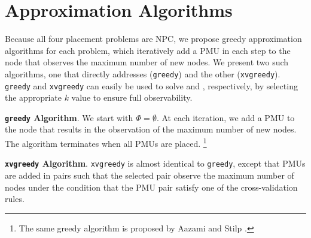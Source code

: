 \section{Approximation Algorithms}
\label{sec:approx}

Because all four placement problems are NPC, we propose greedy approximation algorithms for each problem, which iteratively add 
a PMU in each step to the node that observes the maximum number of new nodes. We present two such algorithms, one that directly addresses \maxinc ({\tt greedy}) and the other 
\xvalpart ({\tt xvgreedy}). {\tt greedy} and {\tt xvgreedy} can easily be used to solve \full and \xvals, respectively, by selecting the appropriate $k$ value to ensure full observability.

{\bf {\tt greedy} Algorithm}. We start with $\Phi = \emptyset$.  At each iteration, we add a PMU to the node that results in the observation of the maximum number of 
new nodes. The algorithm terminates when all PMUs are placed.  {\footnote {\small The same greedy algorithm is proposed by Aazami and Stilp \cite{Aazami07}. }}


{\bf {\tt xvgreedy} Algorithm}. {\tt xvgreedy} is almost identical to {\tt greedy}, except that PMUs are added in pairs such that the selected pair observe
the maximum number of nodes under the condition that the PMU pair satisfy one of the cross-validation rules. %


